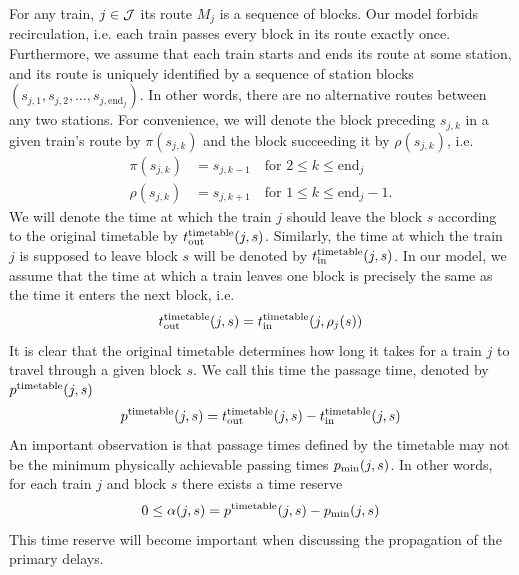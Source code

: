 For any train, $j \in \mathcal{J}$ its route $M_j$ is a sequence of blocks. Our model forbids recirculation,
i.e. each train passes every block in its route exactly once. Furthermore, we assume that each train
starts and ends its route at some station, and its route is uniquely identified by a sequence of
station blocks $\left(s_{j,1}, s_{j, 2}, \ldots, s_{j, \mbox{end}_j}\right)$. In other words, there
are no alternative routes between any two stations. For convenience, we will denote the block
preceding $s_{j,k}$ in a given train's route by $\pi(s_{j,k})$ and the block succeeding it by
$\rho(s_{j,k})$, i.e.
\begin{align}
    \pi(s_{j,k}) &= s_{j,k-1} \quad \mbox{for } 2 \le k \le \mbox{end}_j \\
    \rho(s_{j,k}) &= s_{j,k+1} \quad \mbox{for } 1 \le k \le \mbox{end}_j - 1.
\end{align}
We will denote the time at which the train $j$ should leave the block $s$ according to the original
timetable by $t_\text{out}^\text{timetable}(j, s)$. Similarly, the time at which the train $j$ is supposed to leave block $s$
will be denoted by $t_\text{in}^\text{timetable}(j, s)$. In our model, we assume that the time at which a train leaves one
block is precisely the same as the time it enters the next block, i.e.
\begin{equation}
t_\text{out}^\text{timetable}(j, s) = t_\text{in}^\text{timetable}(j, \rho_j(s))
\end{equation}
It is clear that the original timetable determines how long it takes for a train $j$ to travel
through a given block $s$. We call this time the passage time, denoted by $p^\text{timetable}(j, s)$
\begin{equation}
    p^\text{timetable}(j, s) = t_\text{out}^\text{timetable}(j, s) - t_\text{in}^\text{timetable}(j, s)
\end{equation}
An important observation is that passage times defined by the timetable may not be the minimum physically
achievable passing times $p_\text{min}(j, s)$. In other words, for each train $j$ and block $s$ there
exists a time reserve
\begin{equation}
\label{eq:pt}
0 \le \alpha(j, s) = p^\text{timetable}(j, s) - p_\text{min}(j, s)
\end{equation}
This time reserve will become important when discussing the propagation of the primary delays.

